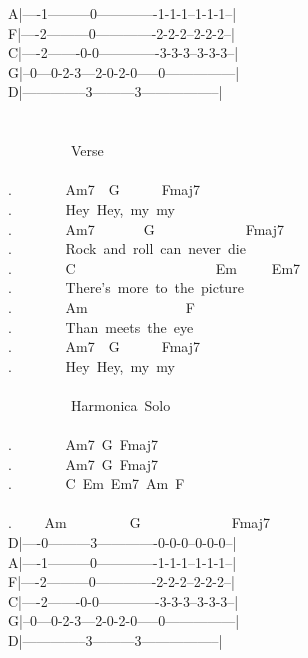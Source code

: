 {A|----1---------0-------------1-1-1--1-1-1--|\\
F|----2---------0-------------2-2-2--2-2-2--|\\
C|----2-------0-0-------------3-3-3--3-3-3--|\\
G|--0---0-2-3---2-0-2-0-----0---------------|\\
D|--------------3---------3-----------------|\\
\\
\\
\ \ \ \ \ \ \ \ \lbrack\ Verse\rbrack\\
\\
. \ \ \ \ \ \ \ Am7\ \ G\ \ \ \ \ \ Fmaj7\\
. \ \ \ \ \ \ \ Hey\ Hey,\ my\ my\\
. \ \ \ \ \ \ \ Am7\ \ \ \ \ \ \ G\ \ \ \ \ \ \ \ \ \ \ \ \ Fmaj7\\
. \ \ \ \ \ \ \ Rock\ and\ roll\ can\ never\ die\\
. \ \ \ \ \ \ \ C\ \ \ \ \ \ \ \ \ \ \ \ \ \ \ \ \ \ \ \ Em\ \ \ \ \ Em7\\
. \ \ \ \ \ \ \ There's\ more\ to\ the\ picture\\
. \ \ \ \ \ \ \ Am\ \ \ \ \ \ \ \ \ \ \ \ \ \ F\\
. \ \ \ \ \ \ \ Than\ meets\ the\ eye\\
. \ \ \ \ \ \ \ Am7\ \ G\ \ \ \ \ \ Fmaj7\\
. \ \ \ \ \ \ \ Hey\ Hey,\ my\ my\\
\\
\ \ \ \ \ \ \ \ \lbrack\ Harmonica\ Solo\rbrack\\
\\
. \ \ \ \ \ \ \ Am7\ G\ Fmaj7\\
. \ \ \ \ \ \ \ Am7\ G\ Fmaj7\\
. \ \ \ \ \ \ \ C\ Em\ Em7\ Am\ F\\
\\
. \ \ \ \ Am\ \ \ \ \ \ \ \ \ G\ \ \ \ \ \ \ \ \ \ \ \ \ Fmaj7\ \ \ \ \ \ \ \ \ \ \ \ \ \\
D|----0---------3-------------0-0-0--0-0-0--|\\
A|----1---------0-------------1-1-1--1-1-1--|\\
F|----2---------0-------------2-2-2--2-2-2--|\\
C|----2-------0-0-------------3-3-3--3-3-3--|\\
G|--0---0-2-3---2-0-2-0-----0---------------|\\
D|--------------3---------3-----------------|}
